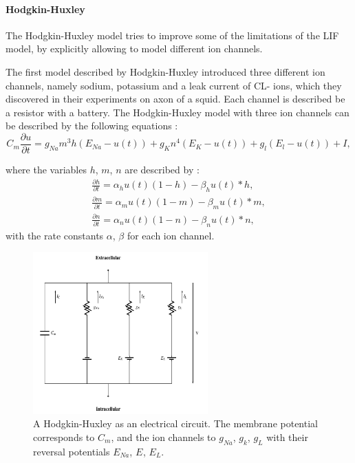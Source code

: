 \paragraph{Hodgkin-Huxley}

The Hodgkin-Huxley model tries to improve some of the limitations of the LIF model, by explicitly allowing to model different ion channels. 

The first model described by Hodgkin-Huxley introduced three different ion channels, namely sodium, potassium and a leak current of CL- ions, which they discovered in their experiments on axon of a squid.
Each channel is described be a resistor with a battery.
The Hodgkin-Huxley model with three ion channels can be described by the following equations :
\[
C_m \frac{\partial u}{\partial t} = g_{Na} m^3 h (E_{Na} - u(t)) + g_K n^4 (E_K - u(t)) + g_l (E_l - u(t)) + I,
\]

where the variables $h$, $m$, $n$  are described by :
\[
\begin{split}
	\frac{\partial h}{\partial t} = \alpha_h u(t) (1-h) - \beta_h u(t) * h , \\
	\frac{\partial m}{\partial t} = \alpha_m u(t) (1-m) - \beta_m u(t) * m , \\
	\frac{\partial n}{\partial t} = \alpha_n u(t) (1-n) - \beta_n u(t) * n ,
\end{split}
\]
with the rate constants $\alpha$, $\beta$ for each ion channel.

\begin{figure}
	\centering
    	\includegraphics[width=0.6\textwidth]{imgs/hode_hux.png} 
    \caption{A Hodgkin-Huxley as an electrical circuit. The membrane potential corresponds to $C_m$, and the ion channels to $g_{Na}$, $g_{k}$, $g_{L}$ with their reversal potentials $E_{Na}$, $E_{}$, $E_{L}$.}
	\label{fig:hogdehux}
\end{figure}

